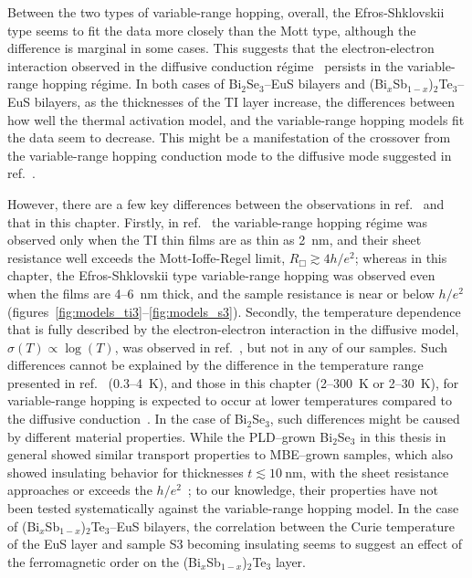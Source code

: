 Between the two types of variable-range hopping, overall, the Efros-Shklovskii type seems to fit the data more closely than the Mott type, although the difference is marginal in some cases. This suggests that the electron-electron interaction observed in the diffusive conduction r\'egime~\cite{Chen2011, Liu2011, Roy2013} persists in the variable-range hopping r\'egime. In both cases of Bi$_2$Se$_3$--EuS bilayers and (Bi$_x$Sb$_{1-x}$)$_2$Te$_3$--EuS bilayers, as the thicknesses of the TI layer increase, the differences between how well the thermal activation model, and the variable-range hopping models fit the data seem to decrease. This might be a manifestation of the crossover from the variable-range hopping conduction mode to the diffusive mode suggested in ref.~\cite{liao2015}.

However, there are a few key differences between the observations in ref.~\cite{liao2015} and that in this chapter. Firstly, in ref.~\cite{liao2015} the variable-range hopping r\'egime was observed only when the TI thin films are as thin as \SI{2}{nm}, and their sheet resistance well exceeds the Mott-Ioffe-Regel limit, $R_\Box \gtrsim 4h/e^2$; whereas in this chapter, the Efros-Shklovskii type variable-range hopping was observed even when the films are 4--\SI{6}{nm} thick, and the sample resistance is near or below $h/e^2$ (figures~\ref{fig:models_ti3}--\ref{fig:models_s3}). Secondly, the temperature dependence that is fully described by the electron-electron interaction in the diffusive model, $\sigma(T) \propto \log(T)$, was observed in ref.~\cite{liao2015}, but not in any of our samples. Such differences cannot be explained by the difference in the temperature range presented in ref.~\cite{liao2015} (0.3--4~K), and those in this chapter (2--300~K or 2--30~K), for variable-range hopping is expected to occur at lower temperatures compared to the diffusive conduction~\cite[ch.~4]{schklovskii_efros}. In the case of Bi$_2$Se$_3$, such differences might be caused by different material properties. While the PLD--grown Bi$_2$Se$_3$ in this thesis in general showed similar transport properties to MBE--grown samples, which also showed insulating behavior for thicknesses $t \lesssim 10~\mathrm{nm}$, with the sheet resistance approaches or exceeds the $h/e^2$~\cite{TI_WAL_thickness}; to our knowledge, their properties have not been tested systematically against the variable-range hopping model. In the case of (Bi$_x$Sb$_{1-x}$)$_2$Te$_3$--EuS bilayers, the correlation between the Curie temperature of the EuS layer and sample S3 becoming insulating seems to suggest an effect of the ferromagnetic order on the (Bi$_x$Sb$_{1-x}$)$_2$Te$_3$ layer.

